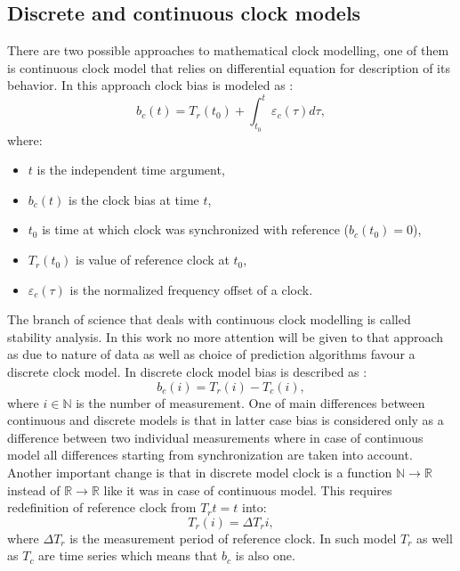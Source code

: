 \subsection{Discrete and continuous clock models}
There are two possible approaches to mathematical clock modelling, one of them is continuous
clock model that relies on differential equation for description of its behavior.
In this approach clock bias is modeled as :
\begin{equation}
	\label{equ:continous_clock}
	b_{c}(t) = T_{r}(t_{0}) +  \int_{t_{0}}^{t} \varepsilon_{c}(\tau) d\tau ,
\end{equation}
where:
\begin{itemize}
	\item $t$ is the independent time argument,
	\item $b_{c}(t)$ is the clock bias at time $t$,
	\item $t_{0}$ is time at which clock was synchronized with reference ($b_{c}(t_{0})=0$),
	\item $T_{r}(t_{0})$ is value of reference clock at $t_{0}$,
	\item $\varepsilon_{c}(\tau)$ is the normalized frequency offset of a clock.
\end{itemize}
The branch of science that deals with continuous clock modelling is called stability analysis.
In this work no more attention will be given to that approach as due to nature of data as well as
choice of prediction algorithms favour a discrete clock model.
In discrete clock model bias is described as :
\begin{equation}
	\label{equ:discrete_clock}
	b_{c}(i) = T_{r}(i) - T_{c}(i),
\end{equation}
where $i \in \mathbb{N}$ is the number of measurement.
One of main differences between continuous and discrete models is that in latter case bias is 
considered only as a difference between two individual measurements where in case of 
continuous model all differences starting from synchronization are taken into account.
Another important change is that in discrete model clock is a function $\mathbb{N} \to \mathbb{R}$
instead of $\mathbb{R} \to \mathbb{R}$ like it was in case of continuous model. 
This requires redefinition of reference clock from $T_r{t}=t$ into:
\begin{equation}
	\label{equ:discrete_reference}
	T_{r}(i) = \Delta T_r i,
\end{equation}
where $\Delta T_r$ is the measurement period of reference clock.
In such model $T_{r}$ as well as $T_{c}$ are time series which means that $b_{c}$ is also one.
